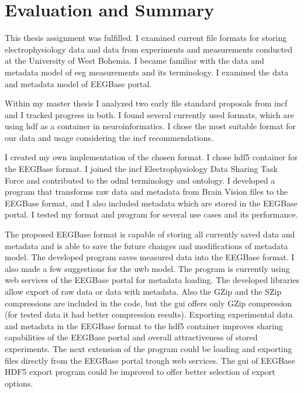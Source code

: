 \chapter {Evaluation and Summary}

This thesis assignment was fulfilled. I examined current file formats for storing electrophysiology data and data from experiments and measurements conducted at the University of West Bohemia. I became familiar with the data and metadata model of \gls{eeg} measurements and its terminology. I examined the data and metadata model of EEGBase portal.

Within my master thesis I analyzed two early file standard proposals from \gls{incf} and I tracked progress in both. I found several currently used formats, which are using \gls{hdf} as a container in neuroinformatics. I chose the most suitable format for our data and usage considering the \gls{incf} recommendations.
 
I created my own implementation of the chosen format. I chose \gls{hdf5} container for the EEGBase format. I joined the \gls{incf} Electrophysiology Data Sharing Task Force and contributed to the \gls{odml} terminology and ontology. I developed a program that transforms raw data and metadata from Brain Vision files to the EEGBase format, and I also included metadata which are stored in the EEGBase portal. I tested my format and program for several use cases and its performance. 

The proposed EEGBase format is capable of storing all currently saved data and metadata and is able to save the future changes and modifications of metadata model. The developed program saves measured data into the EEGBase format. I also made a few suggestions for the \gls{uwb} model. The program is currently using web services of the EEGBase portal for metadata loading. The developed libraries allow export of raw data or data with metadata. Also the GZip and the SZip compressions are included in the code, but the \gls{gui} offers only GZip compression (for tested data it had better compression results). Exporting experimental data and metadata in the EEGBase format to the \gls{hdf5} container improves sharing capabilities of the EEGBase portal and overall attractiveness of stored experiments. 
The next extension of the program could be loading and exporting files directly from the EEGBase portal trough web services. The \gls{gui} of EEGBase HDF5 export program could be improved to offer better selection of export options. 

 


